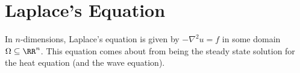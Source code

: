 \section{Laplace's Equation}

\begin{node}\label{pde:laplace-0000}%
In $n$-dimensions, Laplace's equation is given by 
$-\nabla^{2}u=f$ in some domain $\Omega\subseteq\RR^{n}$. This equation
comes about from being the steady state solution for the heat equation
(and the wave equation).
\end{node}